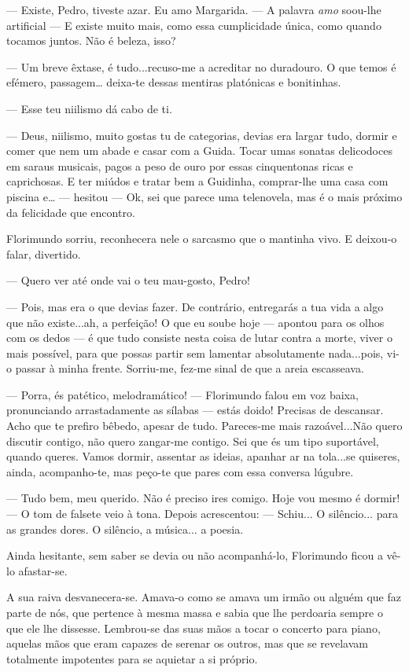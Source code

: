 --- Existe, Pedro, tiveste azar. Eu amo Margarida. ---  A palavra \emph{amo}
soou-lhe artificial --- E existe muito mais, como essa cumplicidade única,
como quando tocamos juntos. Não é beleza, isso?

--- Um breve êxtase, é tudo...recuso-me a acreditar no duradouro. O que
temos é efémero, passagem\ldots{} deixa-te dessas mentiras platónicas e
bonitinhas.

--- Esse teu niilismo dá cabo de ti.

--- Deus, niilismo, muito gostas tu de categorias, devias era largar tudo,
dormir e comer que nem um abade e casar com a Guida. Tocar umas sonatas
delicodoces em saraus musicais, pagos a peso de ouro por essas
cinquentonas ricas e caprichosas. E ter miúdos e tratar bem a Guidinha,
comprar-lhe uma casa com piscina e\ldots{} --- hesitou ---  Ok, sei que
parece uma telenovela, mas é o mais próximo da felicidade que encontro.

Florimundo sorriu, reconhecera nele o sarcasmo que o mantinha vivo. E
deixou-o falar, divertido.

--- Quero ver até onde vai o teu mau-gosto, Pedro!

--- Pois, mas era o que devias fazer. De contrário, entregarás a tua vida
a algo que não existe...ah, a perfeição! O que eu soube hoje --- apontou
para os olhos com os dedos --- é que tudo consiste nesta coisa de lutar
contra a morte, viver o mais possível, para que possas partir sem
lamentar absolutamente nada...pois, vi-o passar à minha frente.
Sorriu-me, fez-me sinal de que a areia escasseava.

--- Porra, és patético, melodramático! --- Florimundo falou em voz baixa,
pronunciando arrastadamente as sílabas --- estás doido! Precisas de
descansar. Acho que te prefiro bêbedo, apesar de tudo. Pareces-me mais
razoável...Não quero discutir contigo, não quero zangar-me contigo. Sei
que és um tipo suportável, quando queres. Vamos dormir, assentar as
ideias, apanhar ar na tola...se quiseres, ainda, acompanho-te, mas
peço-te que pares com essa conversa lúgubre.

--- Tudo bem, meu querido. Não é preciso ires comigo. Hoje vou mesmo é
dormir! --- O tom de falsete veio à tona. Depois acrescentou: --- Schiu... O
silêncio... para as grandes dores. O silêncio, a música... a poesia.

Ainda hesitante, sem saber se devia ou não acompanhá-lo, Florimundo
ficou a vê-lo afastar-se.

A sua raiva desvanecera-se. Amava-o como se amava um irmão ou alguém que
faz parte de nós, que pertence à mesma massa e sabia que lhe perdoaria
sempre o que ele lhe dissesse. Lembrou-se das suas mãos a tocar o
concerto para piano, aquelas mãos que eram capazes de serenar os outros,
mas que se revelavam totalmente impotentes para se aquietar a si
próprio.

